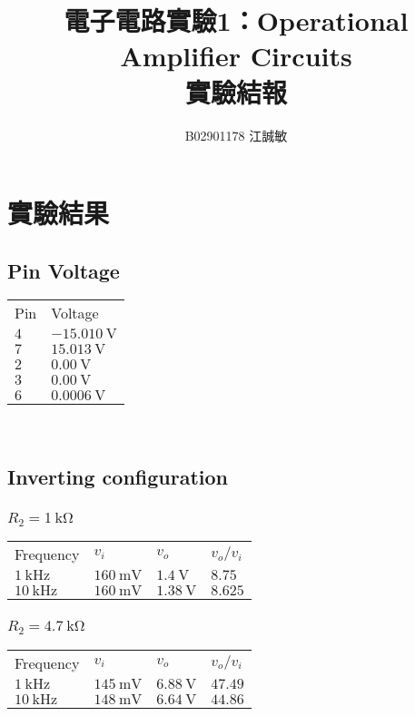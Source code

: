 \documentclass[12pt, a4paper]{article}
\title{ \bf {\Huge 電子電路實驗1：Operational Amplifier Circuits}\\ 實驗結報}
\author{B02901178 江誠敏}
\begin{document}
\maketitle


\section{實驗結果}

\subsection{Pin Voltage}
\begin{center}
  \begin{tabular}{p{2cm}p{3.5cm}}
    \hline
    Pin & Voltage \\
    \hhline{====}
    $4$ & $\SI{-15.010}\V$  \\
    $7$ & $\SI{15.013}\V$  \\
    $2$ & $\SI{0.00}\V$  \\
    $3$ & $\SI{0.00}\V$  \\
    $6$ & $\SI{0.0006}\V$  \\
    \hline
  \end{tabular} \\[10pt]
\end{center}

\subsection{Inverting configuration}
\subsubsection{ $R_2 = \SI{1}\kohm$ }
\begin{center}
  \begin{tabular}{p{3.5cm}p{2.5cm}p{2.5cm}p{2.5cm}}
    \hline
    Frequency & $v_i$ & $v_o$ & $v_o/v_i$ \\
    \hhline{====}
    $\SI{1}{\kHz}$ & $\SI{160}{\mV}$ & $\SI{1.4}{\V}$ & $8.75$  \\
    $\SI{10}{\kHz}$ & $\SI{160}{\mV}$ & $\SI{1.38}{\V}$ & $8.625$  \\
    \hline
  \end{tabular}
\end{center}

\subsubsection{ $R_2 = \SI{4.7}\kohm$ }
\begin{center}
  \begin{tabular}{p{3.5cm}p{2.5cm}p{2.5cm}p{2.5cm}}
    \hline
    Frequency & $v_i$ & $v_o$ & $v_o/v_i$ \\
    \hhline{====}
    $\SI{1}{\kHz}$ & $\SI{145}{\mV}$ & $\SI{6.88}{\V}$ & $47.49$  \\
    $\SI{10}{\kHz}$ & $\SI{148}{\mV}$ & $\SI{6.64}{\V}$ & $44.86$  \\
    \hline
  \end{tabular}
\end{center}
\end{document}
